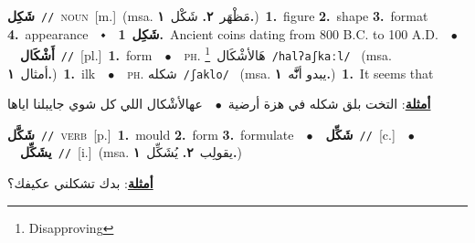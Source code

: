 \documentclass[10pt,a4paper,twoside]{article} %
\begin{document}
\begin{multicols}{2}
{\setlength\topsep{0pt}\textbf{\foreignlanguage{arabic}{شَكِل}}\ {\color{gray}\texttt{//}\color{black}}\ \textsc{noun}\ [m.]\ \color{gray}(msa. \foreignlanguage{arabic}{مَظْهَر}~\foreignlanguage{arabic}{\textbf{٢.}}  \foreignlanguage{arabic}{شَكْل}~\foreignlanguage{arabic}{\textbf{١.}})\color{black}\ \textbf{1.}~figure  \textbf{2.}~shape  \textbf{3.}~format  \textbf{4.}~appearance\ \ $\smblkdiamond$\ \ \setlength\topsep{0pt}\textbf{\foreignlanguage{arabic}{شَكِل}}\ \textbf{1.}~Ancient coins dating from 800 B.C. to 100 A.D.\ \ $\bullet$\ \ \setlength\topsep{0pt}\textbf{\foreignlanguage{arabic}{أَشْكَال}}\ {\color{gray}\texttt{//}\color{black}}\ [pl.]\ \textbf{1.}~form\ \ $\bullet$\ \ \textsc{ph.} \color{gray} \foreignlanguage{arabic}{هَالأشْكَال}\color{black}\ \footnote{Disapproving}\ {\color{gray}\texttt{/{\sffamily halʔaʃkaːl}/}\color{black}}\ \color{gray} (msa. \foreignlanguage{arabic}{أمثال}~\foreignlanguage{arabic}{\textbf{١.}})\color{black}\ \textbf{1.}~ilk\ \ $\bullet$\ \ \textsc{ph.} \color{gray} \foreignlanguage{arabic}{شكله}\color{black}\ {\color{gray}\texttt{/{\sffamily ʃaklo}/}\color{black}}\ \color{gray} (msa. \foreignlanguage{arabic}{يبدو أنََّّه}~\foreignlanguage{arabic}{\textbf{١.}})\color{black}\ \textbf{1.}~It seems that\  \begin{flushright}\color{gray}\foreignlanguage{arabic}{\textbf{\underline{\foreignlanguage{arabic}{أمثلة}}}: التخت بلق شكله في هزة أرضية\ $\bullet$\ \  عهالأشْكال اللي كل شوي جايبلنا اياها}\end{flushright}\color{black}} \vspace{2mm}

{\setlength\topsep{0pt}\textbf{\foreignlanguage{arabic}{شَكَّل}}\ {\color{gray}\texttt{//}\color{black}}\ \textsc{verb}\ [p.]\ \textbf{1.}~mould  \textbf{2.}~form  \textbf{3.}~formulate\ \ $\bullet$\ \ \setlength\topsep{0pt}\textbf{\foreignlanguage{arabic}{شَكِّل}}\ {\color{gray}\texttt{//}\color{black}}\ [c.]\ \ $\bullet$\ \ \setlength\topsep{0pt}\textbf{\foreignlanguage{arabic}{يشَكِّل}}\ {\color{gray}\texttt{//}\color{black}}\ [i.]\ \color{gray}(msa. \foreignlanguage{arabic}{يقولِب}~\foreignlanguage{arabic}{\textbf{٢.}}  \foreignlanguage{arabic}{يُشَكِّل}~\foreignlanguage{arabic}{\textbf{١.}})\color{black}\  \begin{flushright}\color{gray}\foreignlanguage{arabic}{\textbf{\underline{\foreignlanguage{arabic}{أمثلة}}}: بدك تشكلني عكيفك؟}\end{flushright}\color{black}} \vspace{2mm}


\end{multicols}
\end{document}

